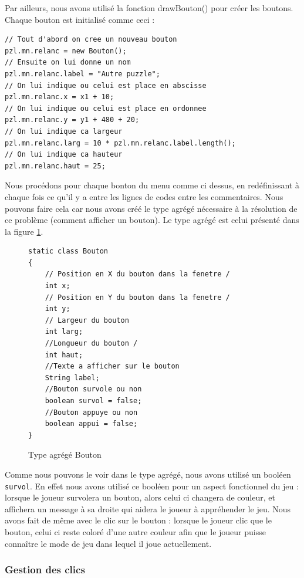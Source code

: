 \documentclass[]{article}
\newcommand{\variable}[1]{\noindent \texttt{#1}}
\begin{document}
Par ailleurs, nous avons utilisé la fonction drawBouton() pour créer les boutons. Chaque bouton est initialisé comme ceci :

\begin{lstlisting}
// Tout d'abord on cree un nouveau bouton
pzl.mn.relanc = new Bouton(); 
// Ensuite on lui donne un nom 
pzl.mn.relanc.label = "Autre puzzle";
// On lui indique ou celui est place en abscisse 
pzl.mn.relanc.x = x1 + 10;
// On lui indique ou celui est place en ordonnee
pzl.mn.relanc.y = y1 + 480 + 20;
// On lui indique ca largeur
pzl.mn.relanc.larg = 10 * pzl.mn.relanc.label.length();
// On lui indique ca hauteur
pzl.mn.relanc.haut = 25;
\end{lstlisting}

Nous procédons pour chaque bonton du menu comme ci dessus, en redéfinissant à chaque fois ce qu'il y a entre les lignes de codes entre les commentaires. Nous pouvons faire cela car nous avons créé le type agrégé nécessaire à la résolution de ce problème (comment afficher un bouton). Le type agrégé est celui présenté dans la figure \no\ref{Type agrégé Bouton}.

\begin{figure}[hpt]
	\center
	\caption{\label{Type agrégé Bouton} Type agrégé Bouton}
\begin{lstlisting}
static class Bouton
{
    // Position en X du bouton dans la fenetre /
    int x;
    // Position en Y du bouton dans la fenetre /
    int y;
    // Largeur du bouton 
    int larg;
    //Longueur du bouton /
    int haut;
    //Texte a afficher sur le bouton 
    String label;
    //Bouton survole ou non 
    boolean survol = false;
    //Bouton appuye ou non 
    boolean appui = false;
} 
\end{lstlisting}
\end{figure}

Comme nous pouvons le voir dans le type agrégé, nous avons utilisé un booléen \variable{survol}. En effet nous avons utilisé ce booléen pour un aspect fonctionnel du jeu : lorsque le joueur survolera un bouton, alors celui ci changera de couleur, et affichera un message à sa droite qui aidera le joueur à appréhender le jeu. Nous avons fait de même avec le clic sur le bouton : lorsque le joueur clic que le bouton, celui ci reste coloré d'une autre couleur afin que le joueur puisse connaître le mode de jeu dans lequel il joue actuellement.
 
\subsubsection{Gestion des clics}
\end{document}
